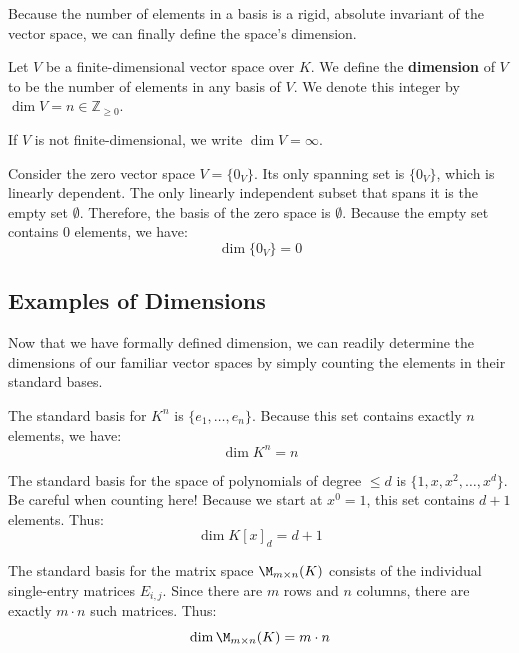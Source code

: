 Because the number of elements in a basis is a rigid, absolute invariant of the vector space, we can finally define the space's dimension.

\begin{definition}[Dimension]
Let $V$ be a finite-dimensional vector space over $K$. We define the \textbf{dimension} of $V$ to be the number of elements in any basis of $V$. 
We denote this integer by $\dim V = n \in \mathbb{Z}_{\ge 0}$.

If $V$ is not finite-dimensional, we write $\dim V = \infty$.
\end{definition}

\begin{remark}
Consider the zero vector space $V = \{0_V\}$. Its only spanning set is $\{0_V\}$, which is linearly dependent. The only linearly independent subset that spans it is the empty set $\emptyset$. 
Therefore, the basis of the zero space is $\emptyset$. Because the empty set contains $0$ elements, we have:
\[
\dim \{0_V\} = 0
\]
\end{remark}

\subsection{Examples of Dimensions}

Now that we have formally defined dimension, we can readily determine the dimensions of our familiar vector spaces by simply counting the elements in their standard bases.

\begin{example}
The standard basis for $K^n$ is $\{e_1, \dots, e_n\}$. Because this set contains exactly $n$ elements, we have:
\[
\dim K^n = n
\]
\end{example}

\begin{example}
The standard basis for the space of polynomials of degree $\le d$ is $\{1, x, x^2, \dots, x^d\}$. Be careful when counting here! Because we start at $x^0 = 1$, this set contains $d+1$ elements. Thus:
\[
\dim K[x]_d = d + 1
\]
\end{example}

\begin{example}[Matrices]
The standard basis for the matrix space $\M_{m \times n}(K)$ consists of the individual single-entry matrices $E_{i,j}$. Since there are $m$ rows and $n$ columns, there are exactly $m \cdot n$ such matrices. Thus:
\[
\dim \M_{m \times n}(K) = m \cdot n
\]
\end{example}

